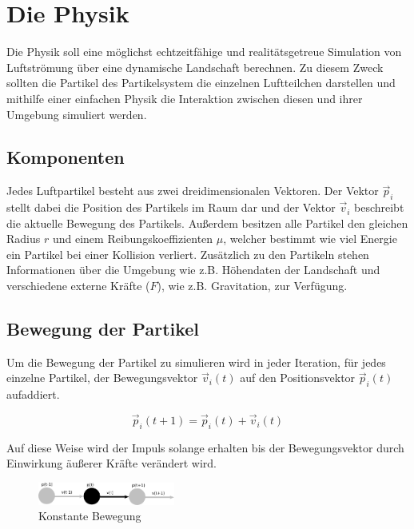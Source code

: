 \section{Die Physik}
\begin{Spacing}{\mylinespace}
    Die Physik soll eine möglichst echtzeitfähige und
    realitätsgetreue Simulation von Luftströmung über eine dynamische Landschaft berechnen.
    Zu diesem Zweck sollten die Partikel des Partikelsystem die einzelnen
    Luftteilchen darstellen und mithilfe einer einfachen Physik
    die Interaktion zwischen diesen und ihrer Umgebung simuliert werden.
    \subsection{Komponenten}
        Jedes Luftpartikel besteht aus zwei dreidimensionalen Vektoren.
        Der Vektor $\vec{p}_{i}$ stellt dabei die Position des Partikels im
        Raum dar und der Vektor $\vec{v}_{i}$ beschreibt die aktuelle Bewegung des Partikels.
        Außerdem besitzen alle Partikel den gleichen Radius $r$ und einem
        Reibungskoeffizienten $\mu$, welcher bestimmt wie viel Energie ein Partikel
        bei einer Kollision verliert.
        Zusätzlich zu den Partikeln stehen Informationen über die Umgebung
        wie z.B. Höhendaten der Landschaft und verschiedene externe
        Kräfte ($F$), wie z.B. Gravitation, zur Verfügung.



    \subsection{Bewegung der Partikel}
        Um die Bewegung der Partikel zu simulieren wird in jeder Iteration,
        für jedes einzelne Partikel, der Bewegungsvektor $\vec{v}_{i}(t)$
        auf den Positionsvektor $ \vec{p}_{i}(t)$ aufaddiert.

        \[ \vec{p}_{i}(t+1) = \vec{p}_{i}(t) + \vec{v}_{i}(t) \]

        Auf diese Weise wird der Impuls solange erhalten bis der Bewegungsvektor
        durch Einwirkung äußerer Kräfte verändert wird.

        \begin{figure}[h!]
			\centering
			\vspace*{30px}
			\includegraphics[width=0.4\textwidth]{graphics/Phys_bew0.png}
			\caption{Konstante Bewegung}
			\label{fig:BewegungPartikel}
		\end{figure}


\end{Spacing}
